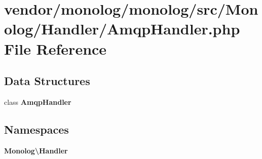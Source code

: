 \section{vendor/monolog/monolog/src/\+Monolog/\+Handler/\+Amqp\+Handler.php File Reference}
\label{_amqp_handler_8php}
\subsection*{Data Structures}
\begin{DoxyCompactItemize}
\item 
class {\bf Amqp\+Handler}
\end{DoxyCompactItemize}
\subsection*{Namespaces}
\begin{DoxyCompactItemize}
\item 
 {\bf Monolog\textbackslash{}\+Handler}
\end{DoxyCompactItemize}
